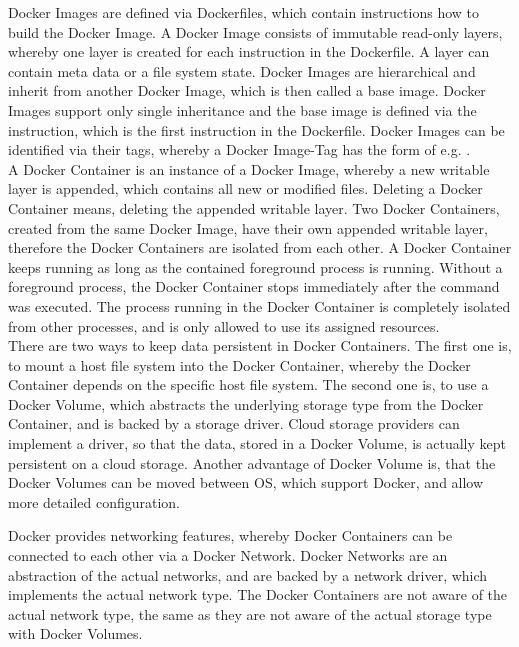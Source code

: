 \label{sec:docker-images}
Docker Images are defined via Dockerfiles, which contain instructions how to build the Docker Image. A Docker Image consists of immutable read-only layers, whereby one layer is created for each instruction in the Dockerfile. A layer can contain meta data or a file system state. Docker Images are hierarchical and inherit from another Docker Image, which is then called a base image. Docker Images support only single inheritance and the base image is defined via the  instruction, which is the first instruction in the Dockerfile. Docker Images can be identified via their tags, whereby a Docker Image-Tag has the form of  e.g. . \\

\label{sec:docker-containers}
A Docker Container is an instance of a Docker Image, whereby a new writable layer is appended, which contains all new or modified files. Deleting a Docker Container means, deleting the appended writable layer. Two Docker Containers, created from the same Docker Image, have their own appended writable layer, therefore the Docker Containers are isolated from each other. A Docker Container keeps running as long as the contained foreground process is running. Without a foreground process, the Docker Container stops immediately after the command was executed. The process running in the Docker Container is completely isolated from other processes, and is only allowed to use its assigned resources. \\

\label{sec:docker-volumes}
There are two ways to keep data persistent in Docker Containers. The first one is, to mount a host file system into the Docker Container, whereby the Docker Container depends on the specific host file system. The second one is, to use a Docker Volume, which abstracts the underlying storage type from the Docker Container, and is backed by a storage driver. Cloud storage providers can implement a driver, so that the data, stored in a Docker Volume, is actually kept persistent on a cloud storage. Another advantage of Docker Volume is, that the Docker Volumes can be moved between OS, which support Docker, and allow more detailed configuration.  

\label{sec:docker-network}
Docker provides networking features, whereby Docker Containers can be connected to each other via a Docker Network. Docker Networks are an abstraction of the actual networks, and are backed by a network driver, which implements the actual network type. The Docker Containers are not aware of the actual network type, the same as they are not aware of the actual storage type with Docker Volumes.

